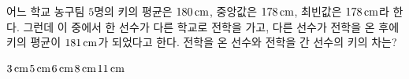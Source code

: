 어느 학교 농구팀 $5$명의 키의 평균은 $180\mkern3mu \mathrm{cm}$, 중앙값은 $178\mkern3mu \mathrm{cm}$, 최빈값은 $178\mkern3mu \mathrm{cm}$라 한다. 그런데 이 중에서 한 선수가 다른 학교로 전학을 가고, 다른 선수가 전학을 온 후에 키의 평균이 $181\mkern3mu \mathrm{cm}$가 되었다고 한다. 전학을 온 선수와 전학을 간 선수의 키의 차는?
\begin{choices32}{$3\mkern3mu \mathrm{cm}$}{$5\mkern3mu \mathrm{cm}$}{$6\mkern3mu \mathrm{cm}$}{$8\mkern3mu \mathrm{cm}$}{$11\mkern3mu \mathrm{cm}$}\end{choices32}
